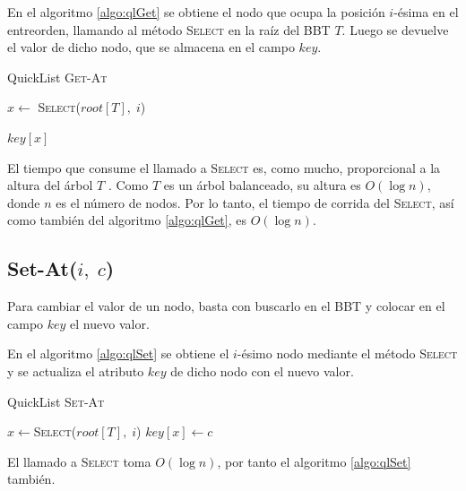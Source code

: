 \documentclass[a4paper,10pt,twocolumn]{article}
\newcommand{\la}{\leftarrow}
\begin{document}
  En el algoritmo \ref{algo:qlGet} se obtiene el nodo que ocupa la posición $ i $-ésima en
  el entreorden, llamando al método \textsc{Select} en la raíz del BBT $ T $. Luego se 
  devuelve el valor de dicho nodo, que se almacena en el campo $ key $.
  
  \begin{algorithm}[htb]\label{algo:qlGet}
  	\caption{QuickList \textsc{Get-At}}
  	
  	\SetAlgoLined
  	
  	
  	\LinesNumbered
  	\SetAlgoVlined
  	
  	$ x \la $ \textsc{Select($root[T],\; i $)}\;
  	
  	\Return $ key[x] $\;
  \end{algorithm}

  El tiempo que consume el llamado a \textsc{Select} es, como mucho, proporcional a la
  altura del árbol $ T $ \cite[pág. 304]{MIT2}. Como $ T $ es un árbol balanceado, su 
  altura es $ O(\log n) $, donde $ n $ es el número de nodos. Por lo tanto, el tiempo de 
  corrida del \textsc{Select}, así como también del algoritmo \ref{algo:qlGet}, es $ 
  O(\log n) $.
\subsection{Set-At($ i,\; c $)}\label{subsec:qlSet}
  Para cambiar el valor de un nodo, basta con buscarlo en el BBT y colocar en el campo
  $ key $ el nuevo valor.
  
  En el algoritmo \ref{algo:qlSet} se obtiene el $ i $-ésimo nodo mediante el método
  \textsc{Select} y se actualiza el atributo $ key $ de dicho nodo con el nuevo valor.
  
  \begin{algorithm}[htb]\label{algo:qlSet}
  	\caption{QuickList \textsc{Set-At}}
  	
  	\SetAlgoLined
  	
  	
  	\LinesNumbered
  	\SetAlgoVlined
  	
  	$ x \la $\textsc{Select($root[T],\; i $)}\;
  	$key[x] \la c$\;
  \end{algorithm}

  El llamado a \textsc{Select} toma $ O(\log n) $, por tanto el algoritmo \ref{algo:qlSet}
  también.
\end{document}
